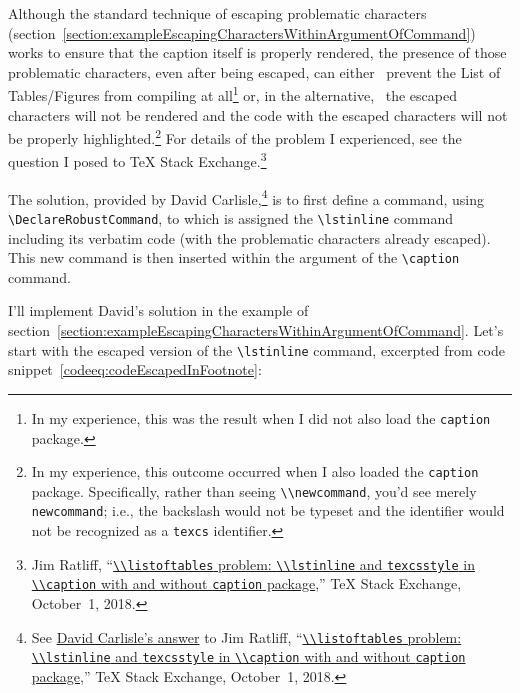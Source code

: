\documentclass[12pt,table,final]{article}%
\begin{document}
Although the standard technique of escaping problematic characters (section~\ref{section:exampleEscapingCharactersWithinArgumentOfCommand}) works to ensure that the caption itself is properly rendered, the presence of those problematic characters, even after being escaped, can either ~prevent the List of Tables/Figures from compiling at all\footnote{In my experience, this was the result when I did not also load the \lstinline|caption| package.} or, in the alternative, ~the escaped characters will not be rendered and the code with the escaped characters will not be properly highlighted.\footnote{In my experience, this outcome occurred when I also loaded the \lstinline|caption| package. Specifically, rather than seeing \lstinline|\\newcommand|, you'd see merely \lstinline|newcommand|; i.e., the backslash would not be typeset and the identifier would not be recognized as a \lstinline|texcs| identifier.} For details of the problem I experienced, see the question I posed to \TeX{} Stack Exchange.\footnote{Jim Ratliff, ``\href{https://tex.stackexchange.com/questions/453359/listoftables-problem-lstinline-and-texcsstyle-in-caption-with-and-without-ca}{\lstinline|\\listoftables| problem: \lstinline|\\lstinline| and \lstinline|texcsstyle| in \lstinline|\\caption| with and without \lstinline|caption| package},'' \TeX{} Stack Exchange, October~1, 2018.}

The solution, provided by David Carlisle,\footnote{See \href{https://tex.stackexchange.com/a/453373/7922}{David Carlisle's answer} to Jim Ratliff, ``\href{https://tex.stackexchange.com/questions/453359/listoftables-problem-lstinline-and-texcsstyle-in-caption-with-and-without-ca}{\lstinline|\\listoftables| problem: \lstinline|\\lstinline| and \lstinline|texcsstyle| in \lstinline|\\caption| with and without \lstinline|caption| package},'' \TeX{} Stack Exchange, October~1, 2018.} is to first define a command, using \lstinline|\DeclareRobustCommand|, to which is assigned the \lstinline|\lstinline| command including its verbatim code (with the problematic characters already escaped). This new command is then inserted within the argument of the \lstinline|\caption| command.

I'll implement David's solution in the example of section~\ref{section:exampleEscapingCharactersWithinArgumentOfCommand}. Let's start with the escaped version of the \lstinline|\lstinline| command, excerpted from code snippet~\ref{codeeq:codeEscapedInFootnote}:
\end{document}
